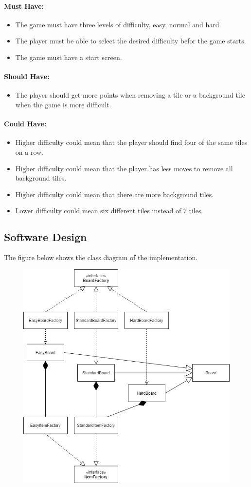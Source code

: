 \documentclass{article}
\begin{document}
\paragraph{Must Have:}
\begin{itemize}
	\item The game must have three levels of difficulty, easy, normal and hard.
	\item The player must be able to select the desired difficulty befor the game starts.
	\item The game must have a start screen.
\end{itemize}

\paragraph{Should Have:}
\begin{itemize}
	\item The player should get more points when removing a tile or a background tile when the game is more difficult.
\end{itemize}


\paragraph{Could Have:}
\begin{itemize}
	\item Higher difficulty could mean that the player should find four of the same tiles on a row.
	\item Higher difficulty could mean that the player has less moves to remove all background tiles.
	\item Higher difficulty could mean that there are more background tiles. 
	\item Lower difficulty could mean six different tiles instead of 7 tiles.
\end{itemize}


\newpage
\subsection{Software Design}
The figure below shows the class diagram of the implementation.
\begin{figure}[H]
\includegraphics[scale=0.55]{Images/DifficultiesClassDiagram.jpg}
\end{figure}
\end{document}
